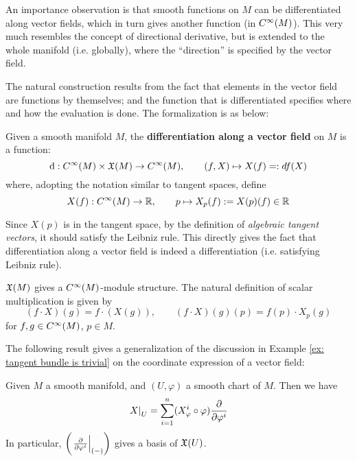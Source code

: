 \documentclass{article}
\begin{document}
An importance observation is that smooth functions on $M$ can be differentiated along vector fields, which in turn gives another function (in $C^{\infty}(M)$). This very much resembles the concept of directional derivative, but is extended to the whole manifold (i.e. globally), where the ``direction'' is specified by the vector field.

The natural construction results from the fact that elements in the vector field are functions by themselves; and the function that is differentiated specifies where and how the evaluation is done. The formalization is as below:

\begin{definition}
    Given a smooth manifold $M$, the \textbf{differentiation along a vector field} on $M$ is a function:
    \[
        \mathrm{d}: C^{\infty}(M) \times \mathfrak{X}(M) \to C^{\infty}(M), \qquad (f, X) \mapsto X(f) =: df(X)
    \]
    where, adopting the notation similar to tangent spaces, define
    \[
        X(f): C^{\infty}(M) \to \mathbb{R}, \qquad p \mapsto X_p(f) := X(p)(f) \in \mathbb{R}
    \]
\end{definition}

\begin{remark}
    Since $X(p)$ is in the tangent space, by the definition of \emph{algebraic tangent vectors}, it should satisfy the Leibniz rule. This directly gives the fact that differentiation along a vector field is indeed a differentiation (i.e. satisfying Leibniz rule).
\end{remark}

\begin{remark}
    $\mathfrak{X}(M)$ gives a $C^{\infty}(M)$-module structure. The natural definition of scalar multiplication is given by
    \[
        (f \cdot X)(g) = f \cdot (X(g)), \qquad (f \cdot X)(g)(p) = f(p) \cdot X_p(g)
    \]
    for $f, g \in C^{\infty}(M)$, $p \in M$.
\end{remark}

The following result gives a generalization of the discussion in Example \ref{ex: tangent bundle is trivial} on the coordinate expression of a vector field:

\begin{proposition}\label{prop: coordinate representation of vector field}
    Given $M$ a smooth manifold, and $(U, \varphi)$ a smooth chart of $M$. Then we have
    \[
        \left.X\right|_{U} = \sum_{i = 1}^{n} (X_{\varphi}^i \circ \varphi) \frac{\partial}{\partial \varphi^i}
    \] 
    In particular, $\left(\left.\frac{\partial}{\partial \varphi^i}\right|_{(-)}\right)$ gives a basis of $\mathfrak{X}(U)$. 
\end{proposition}
\end{document}
